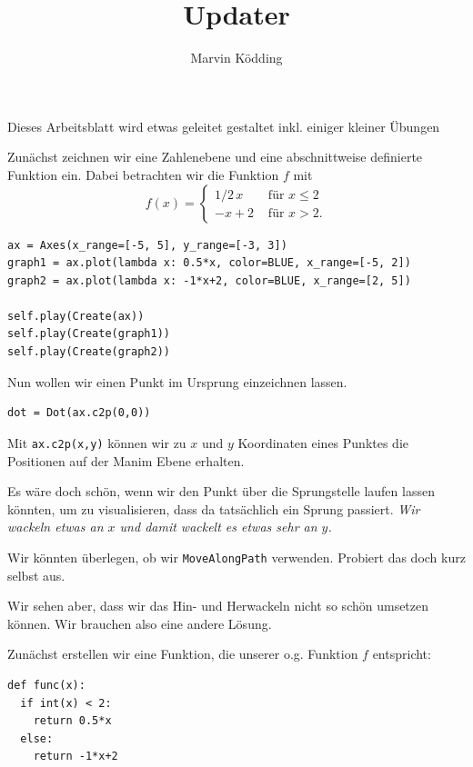 \documentclass[a4paper, 12pt]{mksheetphhd}
\title{Updater}
\author{Marvin Ködding}
\begin{document}
	\printtitle
	
	\vspace*{.5cm}
	
	Dieses Arbeitsblatt wird etwas geleitet gestaltet inkl. einiger kleiner Übungen
	
	Zunächst zeichnen wir eine Zahlenebene und eine abschnittweise definierte Funktion ein. Dabei betrachten wir die Funktion $f$ mit \[f(x) = \begin{cases}
	1/2\, x & \text{ für } x \leq 2\\
	-x + 2 & \text{ für } x > 2.
	\end{cases}\]
	\begin{verbatim}
ax = Axes(x_range=[-5, 5], y_range=[-3, 3])
graph1 = ax.plot(lambda x: 0.5*x, color=BLUE, x_range=[-5, 2])
graph2 = ax.plot(lambda x: -1*x+2, color=BLUE, x_range=[2, 5])

self.play(Create(ax))
self.play(Create(graph1))
self.play(Create(graph2))
	\end{verbatim}
	
	Nun wollen wir einen Punkt im Ursprung einzeichnen lassen.
	
	\begin{verbatim}
dot = Dot(ax.c2p(0,0))
	\end{verbatim}
	
	Mit \verb*|ax.c2p(x,y)| können wir zu $x$ und $y$ Koordinaten eines Punktes die Positionen auf der Manim Ebene erhalten.
	
	Es wäre doch schön, wenn wir den Punkt über die Sprungstelle laufen lassen könnten, um zu visualisieren, dass da tatsächlich ein Sprung passiert. \textit{Wir wackeln etwas an $x$ und damit wackelt es etwas sehr an $y$.}
	
	\begin{aufgabe}
		Wir könnten überlegen, ob wir \verb*|MoveAlongPath| verwenden. Probiert das doch kurz selbst aus.
	\end{aufgabe}
	
	Wir sehen aber, dass wir das \glqq{}Hin- und Herwackeln\grqq{} nicht so schön umsetzen können. Wir brauchen also eine andere Lösung.
	
	Zunächst erstellen wir eine Funktion, die unserer o.g. Funktion $f$ entspricht:
	
	\begin{verbatim}
def func(x):
  if int(x) < 2:
    return 0.5*x
  else:
    return -1*x+2
	\end{verbatim}
	
\end{document}
